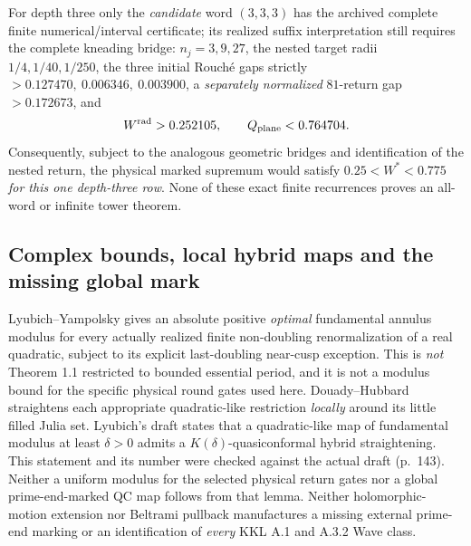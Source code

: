 For depth three only the
\emph{candidate} word $(3,3,3)$
has the archived
complete finite numerical/interval
certificate; its realized
suffix interpretation still
requires the complete kneading
bridge:
$n_j=3,9,27$,
the nested target radii
$1/4,1/40,1/250$,
the three initial
Rouch\'e gaps strictly
$>0.127470,\ 0.006346,\
0.003900$, a \emph{separately
normalized} $81$-return
gap $>0.172673$,
and
\[
 W^{\rm rad}>0.252105,\qquad
 Q_{\rm plane}<0.764704.
\]
Consequently, subject to the
analogous geometric bridges
and identification of the nested
return, the physical marked
supremum would satisfy
$0.25<W^*<0.775$ \emph{for this one
depth-three row}.
None of these exact
finite recurrences proves
an all-word or infinite
tower theorem.

\subsection{Complex bounds, local hybrid maps and the missing global mark}
Lyubich--Yampolsky
\cite[p.~1220, Complex Bounds Theorem]{LyubichYampolsky1997}
gives an absolute positive
\emph{optimal} fundamental
annulus modulus for
every actually realized
finite non-doubling
renormalization of a real
quadratic, subject to its
explicit last-doubling
near-cusp exception.
This is \emph{not}
Theorem 1.1 restricted
to bounded essential period,
and it is not a modulus
bound for the specific
physical round gates
used here.
Douady--Hubbard
\cite[Theorem 1]{DH1985}
straightens each
appropriate quadratic-like
restriction \emph{locally}
around its little filled
Julia set.  Lyubich's draft
\cite[Lemma 4.33]{LyubichNotes}
states that a quadratic-like
map of fundamental modulus
at least $\delta>0$ admits
a $K(\delta)$-quasiconformal
hybrid straightening.
This statement and its
number were checked against
the actual draft (p.~143).
Neither a uniform modulus
for the selected physical
return gates nor a global
prime-end-marked QC map
follows from that lemma.  Neither
holomorphic-motion
extension
\cite{BersRoyden1986,Slodkowski1991}
nor Beltrami pullback
manufactures a missing
external prime-end marking
or an identification of
\emph{every} KKL A.1
and A.3.2 Wave class.

